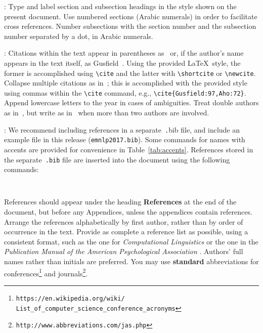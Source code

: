 : Type and label section and subsection headings in
the style shown on the present document.  Use numbered sections (Arabic
numerals) in order to facilitate cross references. Number subsections
with the section number and the subsection number separated by a dot,
in Arabic numerals. 

: Citations within the text appear in parentheses
as~\cite{Gusfield:97} or, if the author's name appears in the text itself,
as Gusfield~.  Using the provided \LaTeX\ style, the
former is accomplished using {\small\verb|\cite|} and the latter with
{\small\verb|\shortcite|} or {\small\verb|\newcite|}.  Collapse multiple
citations as in~\cite{Gusfield:97,Aho:72}; this is accomplished with the
provided style using commas within the {\small\verb|\cite|} command, e.g.,
{\small\verb|\cite{Gusfield:97,Aho:72}|}. Append lowercase letters to the
year in cases of ambiguities. Treat double authors as in~\cite{Aho:72}, but
write as in~\cite{Chandra:81} when more than two authors are involved.  

:  We recommend
including references in a separate~{\small\texttt .bib} file, and include
an example file in this release ({\small\tt emnlp2017.bib}). Some commands
for names with accents are provided for convenience in
Table~\ref{tab:accents}. References stored in the separate~{\small\tt .bib}
file are inserted into the document using the following commands:

\small
\begin{verbatim}


\end{verbatim}
\normalsize 

References should appear under the heading {\bf References} at the end of
the document, but before any Appendices, unless the appendices contain
references. Arrange the references alphabetically by first author, rather
than by order of occurrence in the text.
Provide as complete a reference list as possible, using a consistent format,
such as the one for {\em Computational Linguistics\/} or the one in the 
{\em Publication Manual of the American Psychological Association\/}
\cite{APA:83}. Authors' full names rather than initials are preferred. You
may use {\bf standard} abbreviations for conferences\footnote{\scriptsize {\tt https://en.wikipedia.org/wiki/ \\ \-\hspace{.75cm} List\_of\_computer\_science\_conference\_acronyms}}
and journals\footnote{\tt http://www.abbreviations.com/jas.php}.

